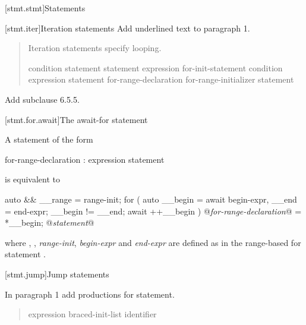
[stmt.stmt]{Statements}%

\setcounter{section}{4}
[stmt.iter]{Iteration statements}%
Add underlined text to paragraph 1.

\begin{quote}
\pnum
Iteration statements specify looping.

%
%
%
%
\begin{bnf}
	\br
	 condition \terminal{)} statement\br
	 statement  expression \terminal{) ;}\br
	 for-init-statement condition\opt \terminal{;} expression\opt \terminal{)} statement\br
	 for-range-declaration \terminal{:} for-range-initializer \terminal{)} statement\br
\end{bnf}
\end{quote}

Add subclause 6.5.5.

\setcounter{subsection}{4}
[stmt.for.await]{The await-for statement}%

\pnum
A  statement of the form

\begin{ncbnf}
	 for-range-declaration : expression \terminal{)} statement
\end{ncbnf}

is equivalent to

\begin{codeblock}
	{
		auto && __range = range-init;
		for ( auto __begin = await begin-expr,
		__end = end-expr;
		__begin != __end;
		await ++__begin ) {
			@\textit{for-range-declaration}@ = *__begin;
			@\textit{statement}@
		}
	}
\end{codeblock}

where , , 
\textit{range-init}, \textit{begin-expr} and \textit{end-expr} are defined as in the range-based for statement .

\setcounter{section}{5}
[stmt.jump]{Jump statements}%

In paragraph 1 add productions for  statement.

\begin{quote}
\begin{bnf}
	\br
	\br
	\br
	 expression\opt \terminal{;}\br
	 braced-init-list \terminal{;}\br
	\br
	\br
	 identifier \terminal{;}
\end{bnf}
\end{quote}

